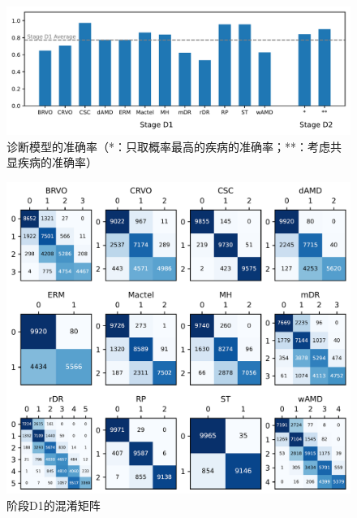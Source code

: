 \documentclass{article}
\begin{document}
	\begin{figure}[htbp]
		\centering
		\includegraphics[width=\linewidth]{Figs/diagnosis1_acc_barchart.png}
		\caption{诊断模型的准确率（*：只取概率最高的疾病的准确率；**：考虑共显疾病的准确率）}
		\vspace{0.3cm}
		\label{fig:D1_acc_bar}
	\end{figure}
	
	\begin{figure}[htbp]
		\centering
		\includegraphics[width=\linewidth]{Figs/diagnosis1_confusion_matrix.png}
		\caption{阶段D1的混淆矩阵}
		\vspace{0.3cm}
		\label{fig:D1_conf_mat}
	\end{figure}
	
\end{document}
